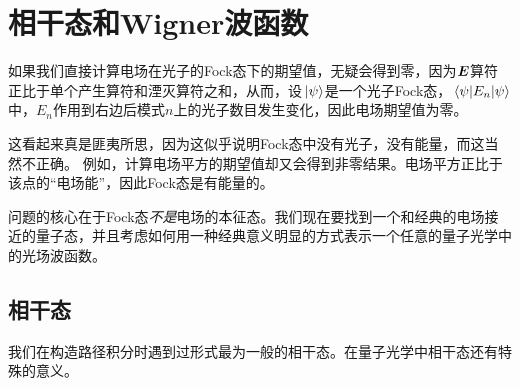 \section{相干态和Wigner波函数}

如果我们直接计算电场在光子的Fock态下的期望值，无疑会得到零，因为$\vb*{E}$算符正比于单个产生算符和湮灭算符之和，从而，设$\ket*{\psi}$是一个光子Fock态，$\mel{\psi}{E_n}{\psi}$中，$E_n$作用到右边后模式$n$上的光子数目发生变化，因此电场期望值为零。

这看起来真是匪夷所思，因为这似乎说明Fock态中没有光子，没有能量，而这当然不正确。
例如，计算电场平方的期望值却又会得到非零结果。电场平方正比于该点的“电场能”，因此Fock态是有能量的。

问题的核心在于Fock态\emph{不是}电场的本征态。我们现在要找到一个和经典的电场接近的量子态，并且考虑如何用一种经典意义明显的方式表示一个任意的量子光学中的光场波函数。

\subsection{相干态}



我们在构造路径积分时遇到过形式最为一般的相干态。在量子光学中相干态还有特殊的意义。

